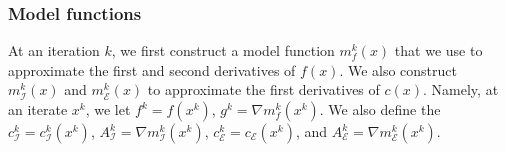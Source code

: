 \documentclass{article}
\DeclareMathOperator*{\argmin}{arg\,min}
\let\oldref\ref
\renewcommand{\ref}[1]{(\oldref{#1})}
\begin{document}
\subsubsection{Model functions}

At an iteration $k$, we first construct a model function $m_f^k(x)$ that we use to approximate the first and second derivatives of $f(x)$.
We also construct $m_{\mathcal{I}}^k(x)$ and $m_{\mathcal{E}}^k(x)$ to approximate the first derivatives of $c(x)$.
Namely, at an iterate $x^k$, we let $f^k = f(x^k)$, $g^k = \nabla m_f^k(x^k)$. %
We also define the $c_{{\mathcal{I}}}^k = c^k_{\mathcal{I}}(x^k)$, 
$A_{{\mathcal{I}}}^k = \nabla m_{\mathcal{I}}^k(x^k)$,
$c_{{\mathcal{E}}}^k = c_{\mathcal{E}}(x^k)$, and
$A_{{\mathcal{E}}}^k = \nabla m_{\mathcal{E}}^k(x^k)$.



\end{document}

